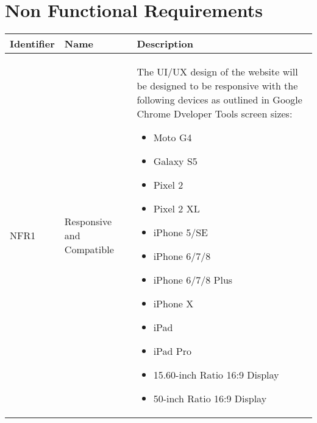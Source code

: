 \section{Non Functional Requirements}

\begin{table}[htp]

\begin{center}
\begin{longtable}{ p{2cm} | p{5cm} | p{9cm} }
\textbf{Identifier} & \textbf{Name} & \textbf{Description} \\
\hline

\fussy NFR1 & \fussy Responsive and Compatible & \fussy The UI/UX design of the website will be designed to be responsive with the following devices as outlined in Google Chrome Dveloper Tools screen sizes:
\begin{itemize}
    \item Moto G4
    \item Galaxy S5
    \item Pixel 2
    \item Pixel 2 XL
    \item iPhone 5/SE
    \item iPhone 6/7/8
    \item iPhone 6/7/8 Plus
    \item iPhone X
    \item iPad
    \item iPad Pro
    \item 15.60-inch Ratio 16:9 Display
    \item 50-inch Ratio 16:9 Display
\end{itemize}


\end{longtable}
\end{center}
\end{table}
